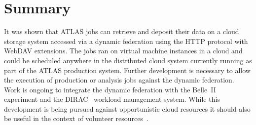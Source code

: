 \documentclass[a4paper]{jpconf}
\begin{document}
\section{Summary}
It was shown that ATLAS jobs can retrieve and deposit their data on a cloud storage system accessed via a dynamic federation using the HTTP protocol with WebDAV extensions. The jobs ran on virtual machine instances in a cloud and could be scheduled anywhere in the distributed cloud system currently running as part of the ATLAS production system. Further development is necessary to allow the execution of production or analysis jobs against the dynamic federation. Work is ongoing to integrate the dynamic federation with the Belle~II~\cite{belle2} experiment and the DIRAC~\cite{dirac} workload management system. While this development is being pursued against opportunistic cloud resources it should also be useful in the context of volunteer resources~\cite{boinc}.
\end{document}
